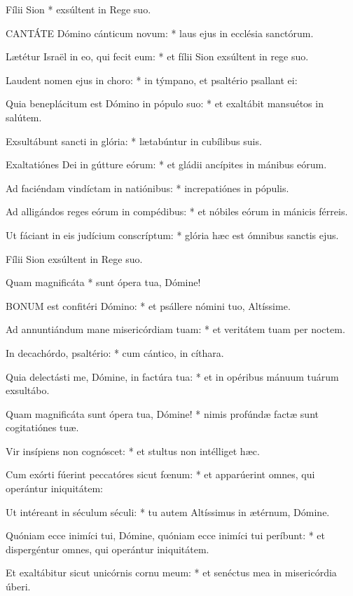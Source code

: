  Fílii Sion * exsúltent in Rege suo.


\lettrine[lines=2]{C}{ANTÁTE} Dómino cánticum novum: * laus ejus in ecclésia sanctórum.

Lætétur Israël in eo, qui fecit eum: * et fílii Sion exsúltent in rege suo.

Laudent nomen ejus in choro: * in týmpano, et psaltério psallant ei:

Quia beneplácitum est Dómino in pópulo suo: * et exaltábit mansuétos in salútem.

Exsultábunt sancti in glória: * lætabúntur in cubílibus suis.

Exaltatiónes Dei in gútture eórum: * et gládii ancípites in mánibus eórum.

Ad faciéndam vindíctam in natiónibus: * increpatiónes in pópulis.

Ad alligándos reges eórum in compédibus: * et nóbiles eórum in mánicis férreis.

Ut fáciant in eis judícium conscríptum: * glória hæc est ómnibus sanctis ejus.

 Fílii Sion exsúltent in Rege suo.

 Quam magnificáta * sunt ópera tua, Dómine!


\lettrine[lines=2]{B}{ONUM} est confitéri Dómino: * et psállere nómini tuo, Altíssime.

Ad annuntiándum mane misericórdiam tuam: * et veritátem tuam per noctem.

In decachórdo, psaltério: * cum cántico, in cíthara.

Quia delectásti me, Dómine, in factúra tua: * et in opéribus mánuum tuárum exsultábo.

Quam magnificáta sunt ópera tua, Dómine! * nimis profúndæ factæ sunt cogitatiónes tuæ.

Vir insípiens non cognóscet: * et stultus non intélliget hæc.

Cum exórti fúerint peccatóres sicut fœnum: * et apparúerint omnes, qui operántur iniquitátem:

Ut intéreant in séculum séculi: * tu autem Altíssimus in ætérnum, Dómine.

Quóniam ecce inimíci tui, Dómine, quóniam ecce inimíci tui períbunt: * et dispergéntur omnes, qui operántur iniquitátem.

Et exaltábitur sicut unicórnis cornu meum: * et senéctus mea in misericórdia úberi.


